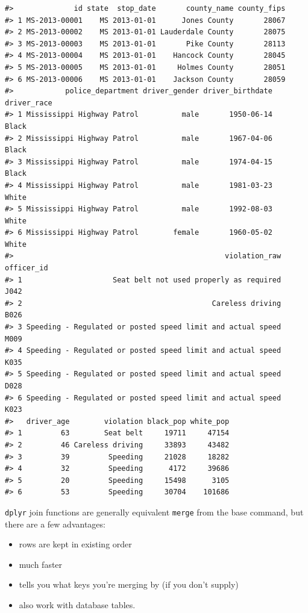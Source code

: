\documentclass[]{book}
\providecommand{\tightlist}{%
  \setlength{\itemsep}{0pt}\setlength{\parskip}{0pt}}
\theoremstyle{definition}
\theoremstyle{definition}
\theoremstyle{definition}
\theoremstyle{remark}
\begin{document}
\begin{verbatim}
#>              id state  stop_date       county_name county_fips
#> 1 MS-2013-00001    MS 2013-01-01      Jones County       28067
#> 2 MS-2013-00002    MS 2013-01-01 Lauderdale County       28075
#> 3 MS-2013-00003    MS 2013-01-01       Pike County       28113
#> 4 MS-2013-00004    MS 2013-01-01    Hancock County       28045
#> 5 MS-2013-00005    MS 2013-01-01     Holmes County       28051
#> 6 MS-2013-00006    MS 2013-01-01    Jackson County       28059
#>            police_department driver_gender driver_birthdate driver_race
#> 1 Mississippi Highway Patrol          male       1950-06-14       Black
#> 2 Mississippi Highway Patrol          male       1967-04-06       Black
#> 3 Mississippi Highway Patrol          male       1974-04-15       Black
#> 4 Mississippi Highway Patrol          male       1981-03-23       White
#> 5 Mississippi Highway Patrol          male       1992-08-03       White
#> 6 Mississippi Highway Patrol        female       1960-05-02       White
#>                                                 violation_raw officer_id
#> 1                     Seat belt not used properly as required       J042
#> 2                                            Careless driving       B026
#> 3 Speeding - Regulated or posted speed limit and actual speed       M009
#> 4 Speeding - Regulated or posted speed limit and actual speed       K035
#> 5 Speeding - Regulated or posted speed limit and actual speed       D028
#> 6 Speeding - Regulated or posted speed limit and actual speed       K023
#>   driver_age        violation black_pop white_pop
#> 1         63        Seat belt     19711     47154
#> 2         46 Careless driving     33893     43482
#> 3         39         Speeding     21028     18282
#> 4         32         Speeding      4172     39686
#> 5         20         Speeding     15498      3105
#> 6         53         Speeding     30704    101686
\end{verbatim}

\texttt{dplyr} join functions are generally equivalent \texttt{merge}
from the base command, but there are a few advantages:

\begin{itemize}
\tightlist
\item
  rows are kept in existing order
\item
  much faster
\item
  tells you what keys you're merging by (if you don't supply)
\item
  also work with database tables.
\end{itemize}
\end{document}
